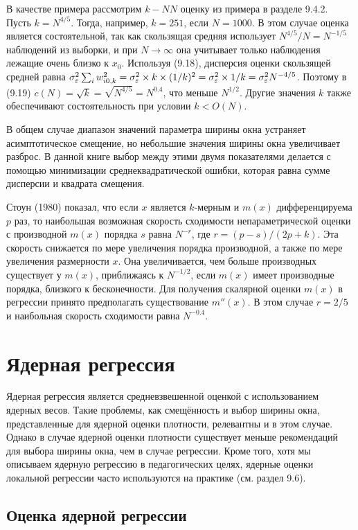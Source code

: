 В качестве примера рассмотрим $k - NN$ оценку из примера в разделе 9.4.2. Пусть $k = N^{4/5}$. Тогда, например, $k = 251$, если $N = 1 000$. В этом случае оценка является состоятельной, так как скользящая средняя использует $N^{4/5}/N = N^{-1/5}$ наблюдений из выборки, и при $N \rightarrow \infty$ она учитывает только наблюдения лежащие очень близко к $x_0$. Используя (9.18), дисперсия оценки скользящей средней равна $\sigma_{\varepsilon}^2 \sum_i w_{i0,k}^2 = \sigma_{\varepsilon}^2 \times k \times (1/k)^2 = \sigma_{\varepsilon}^2 \times 1/k = \sigma_{\varepsilon}^2 N^{-4/5}$. Поэтому в (9.19) $c(N) = \sqrt{k} = \sqrt{N^{4/5}} = N^{0.4}$, что меньше $N^{1/2}$. Другие значения $k$ также обеспечивают состоятельность при условии $k < O(N)$. 
 
В общем случае диапазон значений параметра ширины окна устраняет асимптотическое смещение, но небольшие значения ширины окна увеличивает разброс. В данной книге выбор между этими двумя показателями делается с помощью минимизации среднеквадратической ошибки, которая равна сумме дисперсии и квадрата смещения.

Стоун (1980) показал, что если $x$ является $k$-мерным и $m(x)$ дифференцируема $p$ раз, то наибольшая возможная скорость сходимости непараметрической оценки с производной $m(x)$ порядка $s$ равна $N^{-r}$, где $r = (p - s)/(2p + k)$. Эта скорость снижается по мере увеличения порядка производной, а также по мере увеличения размерности $x$. Она увеличивается, чем больше производных существует у $m(x)$, приближаясь к $N^{-1/2}$, если  $m(x)$ имеет производные порядка, близкого к бесконечности. Для получения скалярной оценки $m(x)$ в регрессии принято предполагать существование $m''(x)$. В этом случае $r = 2/5$ и наибольная скорость сходимости равна $N^{-0.4}$.

\section{Ядерная регрессия}

Ядерная регрессия является средневзвешенной оценкой с использованием ядерных весов. Такие проблемы, как смещённость и выбор ширины окна, представленные для ядерной оценки плотности, релевантны и в этом случае. Однако в случае ядерной оценки плотности существует меньше рекомендаций для выбора ширины окна, чем в случае регрессии. Кроме того, хотя мы описываем ядерную регрессию в педагогических целях, ядерные оценки локальной регрессии часто используются на практике (см. раздел 9.6).

\subsection{Оценка ядерной регрессии}

